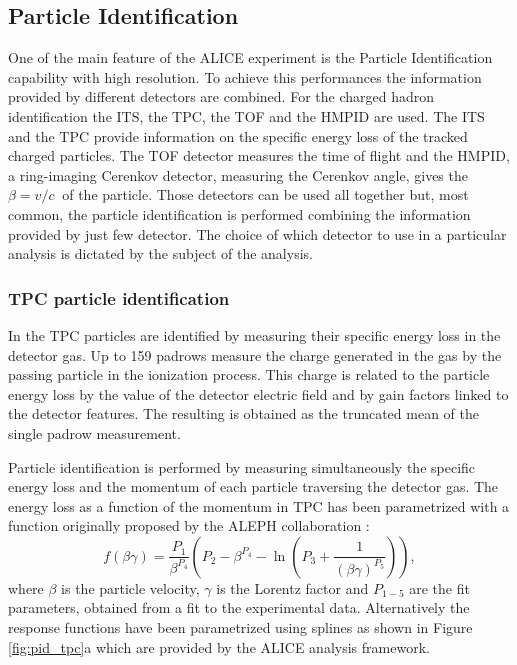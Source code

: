 %
\subsection{Particle Identification} \label{sec:PID}

One of the main feature of the ALICE experiment is the Particle Identification capability with high
resolution. To achieve this performances the information provided by different detectors are combined.
For the charged hadron identification the ITS, the TPC, the TOF and the HMPID are used.
The ITS and the TPC provide information on the specific energy loss of the tracked charged particles.
The TOF detector measures the time of flight and the HMPID, a ring-imaging Cerenkov detector,
measuring the Cerenkov angle, gives the $\beta = v / c\ $ of the particle.
Those detectors can be used all together but, most common, the particle identification is performed
combining the information provided by just few detector.
The choice of which detector to use in a particular analysis is dictated by the subject of the analysis.

\subsubsection{TPC particle identification} 

In the TPC particles are identified by measuring their specific energy loss in the detector gas.
Up to 159 padrows measure the charge generated in the gas by the passing particle in the ionization
process. This charge is related to the particle energy loss by the value of the detector electric
field and by gain factors linked to the detector features. 
The resulting \dedx is obtained as the truncated mean of the single padrow measurement.

Particle identification is performed by measuring simultaneously the specific energy loss \dedx 
and the momentum of each particle traversing the detector gas.
The energy loss as a function of the momentum in TPC has been parametrized with a function originally
proposed by the ALEPH collaboration \cite{aleph}:
\begin{equation} \label{eq:aleph}
    f(\beta \gamma) = \frac{P_{1}}{\beta^{P_{4}}} \left( P_{2} - \beta^{P_{4}}
    - \ln \left( P_{3} + \frac{1}{(\beta \gamma)^{P_{5}}} \right) \right),
\end{equation} 
where $\beta$ is the particle velocity, $\gamma$ is the Lorentz factor and $P_{1-5}$ are the fit
parameters, obtained from a fit to the experimental data.
Alternatively the response functions have been parametrized using splines as shown in Figure
\ref{fig:pid_tpc}a which are provided by the ALICE analysis framework.

